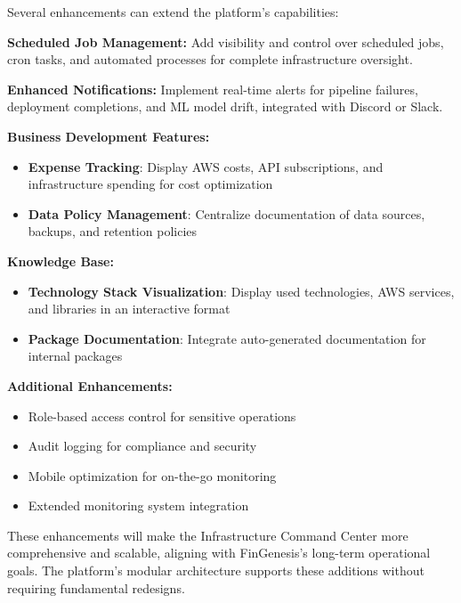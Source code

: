 Several enhancements can extend the platform's capabilities:

\textbf{Scheduled Job Management:} Add visibility and control over scheduled jobs, cron tasks, and automated processes for complete infrastructure oversight.

\textbf{Enhanced Notifications:} Implement real-time alerts for pipeline failures, deployment completions, and ML model drift, integrated with Discord or Slack.

\textbf{Business Development Features:}
\begin{itemize}
    \item \textbf{Expense Tracking}: Display AWS costs, API subscriptions, and infrastructure spending for cost optimization
    \item \textbf{Data Policy Management}: Centralize documentation of data sources, backups, and retention policies
\end{itemize}

\textbf{Knowledge Base:}
\begin{itemize}
    \item \textbf{Technology Stack Visualization}: Display used technologies, AWS services, and libraries in an interactive format
    \item \textbf{Package Documentation}: Integrate auto-generated documentation for internal packages
\end{itemize}

\textbf{Additional Enhancements:}
\begin{itemize}
    \item Role-based access control for sensitive operations
    \item Audit logging for compliance and security
    \item Mobile optimization for on-the-go monitoring
    \item Extended monitoring system integration
\end{itemize}

These enhancements will make the Infrastructure Command Center more comprehensive and scalable, aligning with FinGenesis's long-term operational goals. The platform's modular architecture supports these additions without requiring fundamental redesigns.